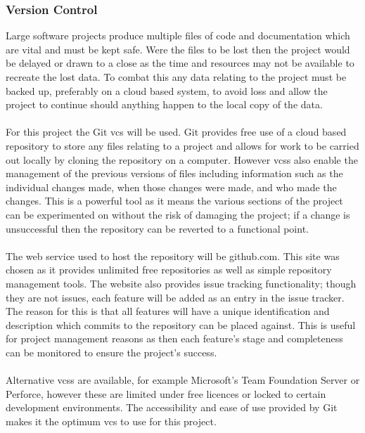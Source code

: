 	\subsubsection{Version Control}
		Large software projects produce multiple files of code and documentation which are vital and must be kept safe. Were the files to be lost then the project would be delayed or drawn to a close as the time and resources may not be available to recreate the lost data. To combat this any data relating to the project must be backed up, preferably on a cloud based system, to avoid loss and allow the project to continue should anything happen to the local copy of the data.
		\\\\
		For this project the Git \gls{vcs} will be used. Git provides free use of a cloud based repository to store any files relating to a project and allows for work to be carried out locally by cloning the repository on a computer. However \glspl{vcs} also enable the management of the previous versions of files including information such as the individual changes made, when those changes were made, and who made the changes. This is a powerful tool as it means the various sections of the project can be experimented on without the risk of damaging the project; if a change is unsuccessful then the repository can be reverted to a functional point.
		\\\\
		The web service used to host the repository will be github.com. This site was chosen as it provides unlimited free repositories as well as simple repository management tools. The website also provides issue tracking functionality; though they are not issues, each feature will be added as an entry in the issue tracker. The reason for this is that all features will have a unique identification and description which commits to the repository can be placed against. This is useful for project management reasons as then each feature's stage and completeness can be monitored to ensure the project's success.
		\\\\
		Alternative \glspl{vcs} are available, for example Microsoft's Team Foundation Server or Perforce, however these are limited under free licences or locked to certain development environments. The accessibility and ease of use provided by Git makes it the optimum \gls{vcs} to use for this project. 
